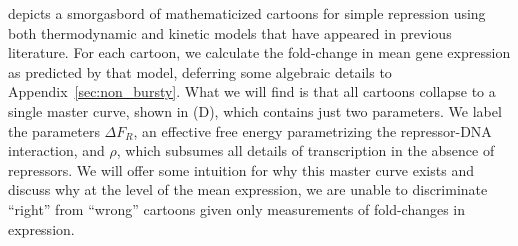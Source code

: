  depicts a smorgasbord of mathematicized cartoons for
simple repression using both thermodynamic and kinetic models that have appeared
in previous literature. For each cartoon, we calculate the fold-change in mean
gene expression as predicted by that model, deferring some algebraic details to
Appendix~\ref{sec:non_bursty}. What we will find is that all cartoons collapse
to a single master curve, shown in (D), which contains
just two parameters. We label the parameters $\Delta F_R$, an effective free
energy parametrizing the repressor-DNA interaction, and $\rho$, which subsumes
all details of transcription in the absence of repressors. We will offer some
intuition for why this master curve exists and discuss why at the level of the
mean expression, we are unable to discriminate ``right'' from ``wrong'' cartoons
given only measurements of fold-changes in expression.

